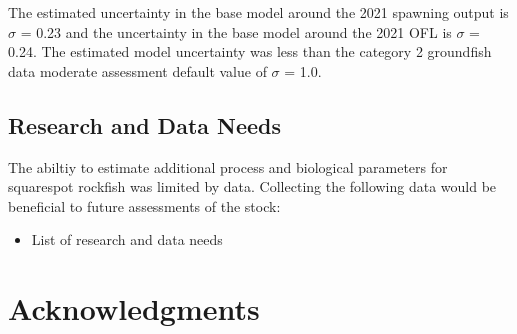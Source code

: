 \documentclass[11pt,
  english,
  a4paper,
]{article}
\begin{document}
\leavevmode\tagmcend\tagstructend


The estimated uncertainty in the base model around the 2021 spawning output is {\(\sigma\)\leavevmode\tagmcend\tagstructend} = 0.23 and the uncertainty in the base model around the 2021 OFL is {\(\sigma\)\leavevmode\tagmcend\tagstructend} = 0.24. The estimated model uncertainty was less than the category 2 groundfish data moderate assessment default value of {\(\sigma\)\leavevmode\tagmcend\tagstructend} = 1.0.

\leavevmode\tagmcend\tagstructend\par


\hypertarget{research-and-data-needs}{%
\subsection{Research and Data Needs}\label{research-and-data-needs}}

\leavevmode\tagmcend\tagstructend


The abiltiy to estimate additional process and biological parameters for squarespot rockfish was limited by data. Collecting the following data would be beneficial to future assessments of the stock:

\leavevmode\tagmcend\tagstructend\par

\begin{itemize}

    \item List of research and data needs

\end{itemize}


\hypertarget{acknowledgments}{%
\section{Acknowledgments}\label{acknowledgments}}

\leavevmode\tagmcend\tagstructend

\end{document}
